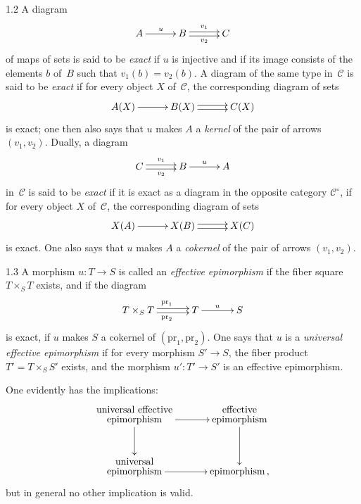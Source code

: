 \begin{definition}{1.2}
\label{IV.1.2}
A diagram
\[
\xymatrix@C=3em{
A \ar[r]^{u}
  & B \ar@<0.5ex>[r]^{v_{1}} \ar@<-0.5ex>[r]_{v_{2}}
  & C
}
\]
of maps of sets is said to be \emph{exact} if \(u\) is injective and if its
image consists of the elements \(b\) of~\(B\) such that
\(v_{1}(b)=v_{2}(b)\). A diagram of the same type in~\(\mathcal{C}\) is said
to be \emph{exact} if for every object \(X\) of~\(\mathcal{C}\), the
corresponding diagram of sets
\[
\xymatrix@C=3em{
A(X) \ar[r]
  & B(X) \ar@<0.5ex>[r] \ar@<-0.5ex>[r]
  & C(X)
}
\]
is exact; one then also says that \(u\) makes \(A\) a \emph{kernel} of the
pair of arrows \((v_{1},v_{2})\). Dually, a diagram
\[
\xymatrix@C=3em{
C \ar@<0.5ex>[r]^{v_{1}} \ar@<-0.5ex>[r]_{v_{2}}
  & B \ar[r]^{u}
  & A
}
\]
in~\(\mathcal{C}\) is said to be \emph{exact} if it is exact as a diagram in
the opposite category \(\mathcal{C}^{\circ}\), \ie if for every object \(X\)
of~\(\mathcal{C}\), the corresponding diagram of sets
\[
\xymatrix@C=3em{
X(A) \ar[r]
  & X(B) \ar@<0.5ex>[r] \ar@<-0.5ex>[r]
  & X(C)
}
\]
is exact.%
{\renewcommand{\thefootnote}{(2)}}
One also says that \(u\) makes \(A\) a \emph{cokernel} of the pair of arrows
\((v_{1},v_{2})\).
\end{definition}

\begin{definition}{1.3}
\label{IV.1.3}
A morphism \(u\colon T\to S\) is called an \emph{effective epimorphism} if
the fiber square \(T\times_{S}T\) exists, and if the diagram
\[
\xymatrix@C=3.2em{
T\times_{S}T
  \ar@<0.5ex>[r]^{\mathrm{pr}_{1}}
  \ar@<-0.5ex>[r]_{\mathrm{pr}_{2}}
  & T \ar[r]^{u}
  & S
}
\]
is exact, \ie if \(u\) makes \(S\) a cokernel of
\((\mathrm{pr}_{1},\mathrm{pr}_{2})\). One says that \(u\) is a
\emph{universal effective epimorphism} if for every morphism \(S'\to S\),
the fiber product \(T'=T\times_{S}S'\) exists, and the morphism
\(u'\colon T'\to S'\) is an effective epimorphism.
\end{definition}

One evidently has the implications:
\[
\xymatrix@C=3.2em@R=2.8em{
\mbox{\shortstack{universal effective\\epimorphism}} \ar[r] \ar[d]
  & \mbox{\shortstack{effective\\epimorphism}} \ar[d] \\
\mbox{\shortstack{universal\\epimorphism}} \ar[r]
  & \mbox{epimorphism}\,,
}
\]
but in general no other implication is valid.%
{\renewcommand{\thefootnote}{(3)}}

